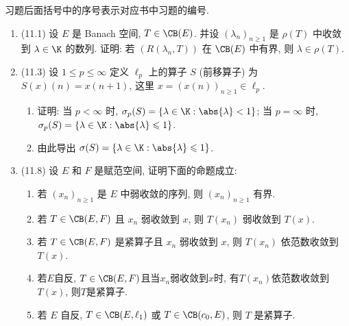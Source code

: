 	习题后面括号中的序号表示对应书中习题的编号.
	
	\begin{enumerate}[label=\textbf{\arabic*.}, ref=\arabic*]
	\item (11.1) 设 $ E $ 是 Banach 空间, $ T\in\CB(E) $. 并设 $ (\lambda_{n})_{n\geqslant1} $ 是 $ \rho(T) $ 中收敛到 $ \lambda\in\K $ 的数列. 证明: 若 $ (R(\lambda_{n}, T)) $ 在 $ \CB(E) $ 中有界, 则 $ \lambda\in\rho(T) $.
	\item (11.3) 设 $ 1\leqslant p\leqslant\infty $ 定义 $ \ell_{p} $ 上的算子 $ S $ (前移算子) 为 $ S(x)(n)=x(n+1) $, 这里 $ x=(x(n))_{n\geqslant1}\in\ell_{p} $.
		\begin{enumerate}[(1)]
			\item 证明: 当 $ p<\infty $ 时, $ \sigma_{p}(S)=\{ \lambda\in\K:\abs{\lambda}<1 \} $; 当 $ p=\infty $ 时, $ \sigma_{p}(S)=\{ \lambda\in\K:\abs{\lambda}\leqslant1 \} $.
			\item 由此导出 $ \sigma(S)=\{ \lambda\in\K:\abs{\lambda}\leqslant1 \} $.
		\end{enumerate}
	\item (11.8) 设 $ E $ 和 $ F $ 是赋范空间, 证明下面的命题成立:
		\begin{enumerate}[(1)]
			\item 若 $ (x_{n})_{n\geqslant1} $ 是 $ E $ 中弱收敛的序列, 则 $ (x_{n})_{n\geqslant1} $ 有界.
			\item 若 $ T\in\CB(E, F) $ 且 $ x_{n} $ 弱收敛到 $ x $, 则 $ T(x_{n}) $ 弱收敛到 $ T(x) $.
			\item 若 $ T\in\CB(E, F) $ 是紧算子且 $ x_{n} $ 弱收敛到 $ x $, 则 $ T(x_{n}) $ 依范数收敛到 $ T(x) $.
			\item 若$ E $自反, $ T\in\CB(E,F) $且当$ x_n $弱收敛到$ x $时, 有$ T(x_n) $依范数收敛到$ T(x) $, 则$ T $是紧算子. 
			\item 若 $ E $ 自反, $ T\in\CB(E, \ell_{1}) $ 或 $ T\in\CB(c_{0}, E) $, 则 $ T $ 是紧算子.
		\end{enumerate}
	\end{enumerate}
